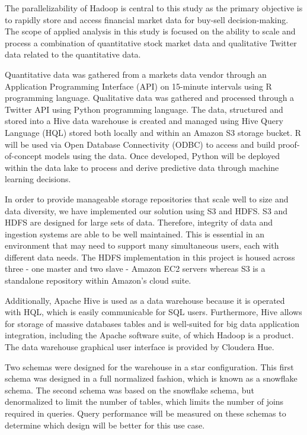 \documentclass[journal]{IEEEtran}
\begin{document}
The parallelizability of Hadoop is central to this study as the primary
 objective is to rapidly store and access financial market data for 
 buy-sell decision-making. 
The scope of applied analysis in this study is focused on the ability to
 scale and process a combination of quantitative stock market data and
 qualitative Twitter data related to the quantitative data. 

Quantitative data was gathered from a markets data vendor through an
 Application Programming Interface (API) on 15-minute intervals using R
 programming language. 
Qualitative data was gathered and processed through a Twitter API
 using Python programming language. 
The data, structured and stored into a Hive data warehouse is created and
 managed using Hive Query Language (HQL) stored both locally and
 within an Amazon S3 storage bucket. 
R will be used via Open Database Connectivity (ODBC) to access and
 build proof-of-concept models using the data. Once developed,
 Python will be deployed within the data lake to process and
 derive predictive data through machine learning decisions.

In order to provide manageable storage repositories that scale 
 well to size and data diversity, 
 we have implemented our solution using S3 and HDFS. 
S3 and HDFS are designed for large sets of data. 
Therefore, integrity of data and ingestion systems are able
 to be well maintained. 
This is essential in an environment that may need to support 
 many simultaneous users, each with different data needs. 
The HDFS implementation in this project is housed across three 
 - one master and two slave - Amazon EC2 servers 
 whereas S3 is a standalone repository within Amazon's cloud suite.

Additionally, Apache Hive is used as a data warehouse 
 because it is operated with HQL, 
 which is easily communicable for SQL users. 
Furthermore, Hive allows for storage of massive databases tables and
 is well-suited for big data application integration, 
 including the Apache software suite, of which Hadoop is a product. 
The data warehouse graphical user interface is provided by Cloudera Hue.

Two schemas were designed for the warehouse in a star configuration.
This first schema was designed in a full normalized fashion,
 which is known as a snowflake schema.
The second schema was based on the snowflake schema, 
 but denormalized to limit the number of tables, 
 which limits the number of joins required in queries.
Query performance will be measured on these schemas to determine
 which design will be better for this use case. 
\end{document}
